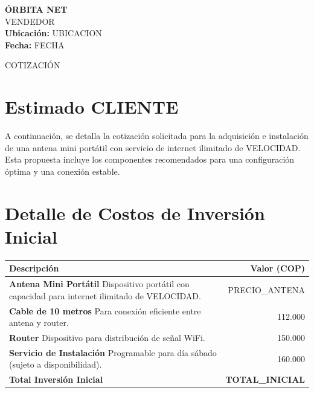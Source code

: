 \documentclass[11pt, a4paper]{article}
\begin{document}
\begin{minipage}{0.6\textwidth}
    {\Huge \textbf{\color{primary}ÓRBITA NET}}\\[0.2cm]
    {\large {{VENDEDOR}}}\\[0.2cm]
    \textbf{Ubicación:} {{UBICACION}}\\
    \textbf{Fecha:} {{FECHA}}
\end{minipage}
\hfill
\begin{minipage}{0.35\textwidth}
    \begin{flushright}
        \Huge \color{gray!50} COTIZACIÓN
    \end{flushright}
\end{minipage}

\vspace{1cm}

\section*{Estimado {{CLIENTE}}}
A continuación, se detalla la cotización solicitada para la adquisición e instalación de una antena mini portátil con servicio de internet ilimitado de {{VELOCIDAD}}. Esta propuesta incluye los componentes recomendados para una configuración óptima y una conexión estable.

\vspace{0.5cm}

\section*{Detalle de Costos de Inversión Inicial}
\renewcommand{\arraystretch}{1.5}
\begin{tabular}{p{} r}
    \toprule
    \textbf{Descripción} & \textbf{Valor (COP)} \\
    \midrule
    \textbf{Antena Mini Portátil} \newline \small{Dispositivo portátil con capacidad para internet ilimitado de {{VELOCIDAD}}.} & {{PRECIO_ANTENA}} \\
    
    \textbf{Cable de 10 metros} \newline \small{Para conexión eficiente entre antena y router.} & 112.000 \\
    
    \textbf{Router} \newline \small{Dispositivo para distribución de señal WiFi.} & 150.000 \\
    
    \textbf{Servicio de Instalación} \newline \small{Programable para día sábado (sujeto a disponibilidad).} & 160.000 \\
    \midrule
    \textbf{\large Total Inversión Inicial} & \textbf{\large {{TOTAL_INICIAL}}} \\
    \bottomrule
\end{tabular}
\end{document}
